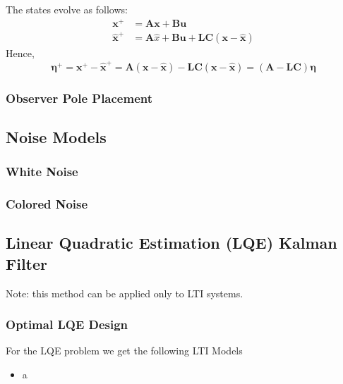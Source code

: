 The states evolve as follows:
\begin{align*}
    \mathbf{x}^+       & =\mathbf{Ax}+\mathbf{Bu}                     \\
    \mathbf{\hat{x}^+} & =\mathbf{A}\hat{x}+\mathbf{Bu}+\mathbf{LC(x-\hat{x})}
\end{align*}
Hence,
\begin{equation*}
    \mathbf{\eta^+}=\mathbf{x^+}-\mathbf{\hat{x}^+}=\mathbf{A}(\mathbf{x}-\mathbf{\hat{x}})-\mathbf{LC}(\mathbf{x}-\mathbf{\hat{x}})=(\mathbf{A}-\mathbf{LC})\mathbf{\eta}
\end{equation*}

\subsubsection{Observer Pole Placement}

%


%


\subsection{Noise Models}
\subsubsection{White Noise}

\subsubsection{Colored Noise}



\subsection{Linear Quadratic Estimation (LQE) Kalman Filter}
Note: this method can be applied only to LTI systems.

\subsubsection{Optimal LQE Design}
For the LQE problem we get the following LTI Models

%
\begin{itemize}
    \item a
\end{itemize}